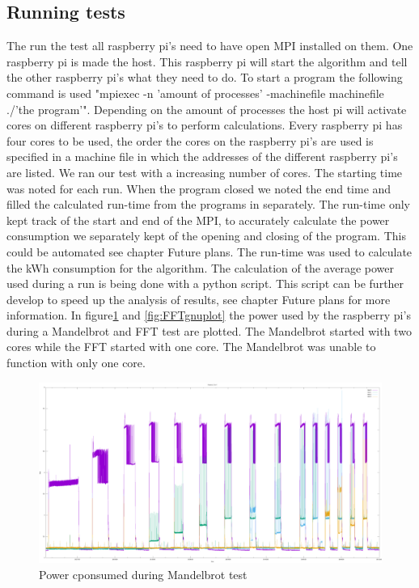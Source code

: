 \documentclass{article}
\begin{document}
\subsection{Running tests}
The run the test all raspberry pi's need to have open MPI installed on them. One raspberry pi is made the host. This raspberry pi will start the algorithm and tell the other raspberry pi's what they need to do. To start a program the following command is used "mpiexec -n 'amount of processes' -machinefile machinefile ./'the program'". Depending on the amount of processes the host pi will activate cores on different raspberry pi's to perform calculations. Every raspberry pi has four cores to be used, the order the cores on the raspberry pi's are used is specified in a machine file in which the addresses of the different raspberry pi's are listed. 
\newline
We ran our test with a increasing number of cores. The starting time was noted for each run. When the program closed we noted the end time and filled the calculated run-time from the programs in separately. The run-time only kept track of the start and end of the MPI, to accurately calculate the power consumption we separately kept of the opening and closing of the program. This could be automated see chapter Future plans. The run-time was used to calculate the kWh consumption for the algorithm. The calculation of the average power used during a run is being done with a python script. This script can be further develop to speed up the analysis of results, see chapter Future plans for more information. 
\newline
In figure\ref{fig:Mandelgnuplot} and \ref{fig:FFTgnuplot} the power used by the raspberry pi's during a Mandelbrot and FFT test are plotted. The Mandelbrot started with two cores while the FFT started with one core. The Mandelbrot was unable to function with only one core.

\begin{figure}[H]
\centering
\includegraphics[width=12cm]{images/power.png}
\caption{Power cponsumed during Mandelbrot test}
\label{fig:Mandelgnuplot}
\end{figure}
\end{document}

